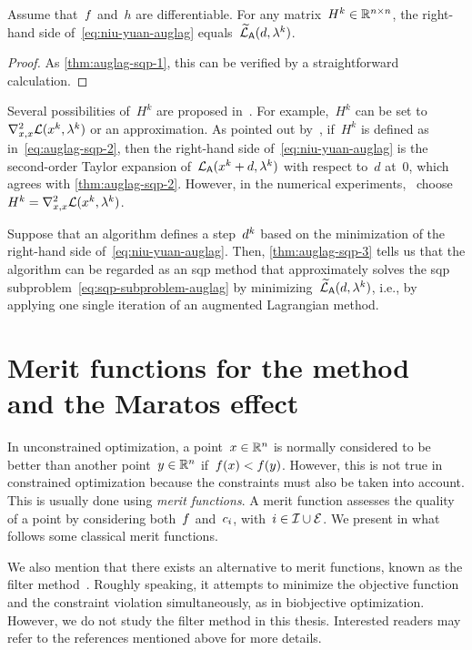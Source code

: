 \begin{theorem}
    \label{thm:auglag-sqp-3}
    Assume that~$f$ and~$h$ are differentiable.
    For any matrix~$H^k \in \mathbb{R}^{n \times n}$, the right-hand side of~\cref{eq:niu-yuan-auglag} equals~$\auglagalt(\step, \lm[k])$.
\end{theorem}

\begin{proof}
    As \cref{thm:auglag-sqp-1}, this can be verified by a straightforward calculation.
\end{proof}

Several possibilities of~$H^k$ are proposed in~\cite{Niu_Yuan_2010,Wang_Yuan_2014}.
For example,~$H^k$ can be set to~$\nabla_{x, x}^2 \lag(\iter[k], \lm[k])$ or an approximation.
As pointed out by~\cite[\S~2.1]{Niu_Yuan_2010}, if~$H^k$ is defined as in~\cref{eq:auglag-sqp-2}, then the right-hand side of~\cref{eq:niu-yuan-auglag} is the second-order Taylor expansion of~$\auglag(\iter[k] + d, \lm[k])$ with respect to~$d$ at~$0$, which agrees with \cref{thm:auglag-sqp-2}.
However, in the numerical experiments,~\cite{Niu_Yuan_2010,Wang_Yuan_2014} choose~$H^k = \nabla_{x, x}^2 \lag(\iter[k], \lm[k])$.

Suppose that an algorithm defines a step~$\step[k]$ based on the minimization of the right-hand side of~\cref{eq:niu-yuan-auglag}.
Then, \cref{thm:auglag-sqp-3} tells us that the algorithm can be regarded as an \gls{sqp} method that approximately solves the \gls{sqp} subproblem~\cref{eq:sqp-subproblem-auglag} by minimizing~$\auglagalt(\step, \lm[k])$, i.e., by applying one single iteration of an augmented Lagrangian method.

\section{Merit functions for the  method and the Maratos effect}
\label{sec:sqp-merit-functions}

In unconstrained optimization, a point~$x \in \mathbb{R}^n$ is normally considered to be better than another point~$y \in \mathbb{R}^n$ if~$f(x) < f(y)$.
However, this is not true in constrained optimization because the constraints must also be taken into account.
This is usually done using \emph{merit functions}.
A merit function assesses the quality of a point by considering both~$f$ and~$c_{i}$, with~$i \in \mathcal{I} \cup \mathcal{E}$.
We present in what follows some classical merit functions.

We also mention that there exists an alternative to merit functions, known as the filter method~\cite{Fletcher_Leyffer_2002,Fletcher_Leyffer_Toint_1998,Fletcher_Leyffer_Toint_2002,Fletcher_Leyffer_Toint_2006,Riberio_Karas_Gonzaga_2008}.
Roughly speaking, it attempts to minimize the objective function and the constraint violation simultaneously, as in biobjective optimization.
However, we do not study the filter method in this thesis.
Interested readers may refer to the references mentioned above for more details.

